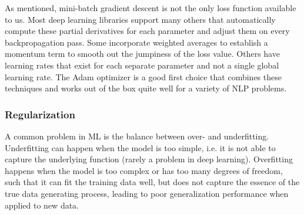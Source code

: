 As mentioned, mini-batch gradient descent is not the only loss function available to us. Most deep learning libraries support many others that
automatically compute these partial derivatives for each parameter and adjust them on every backpropagation pass. Some incorporate weighted averages to establish
a momentum term to smooth out the jumpiness of the loss value. Others have learning rates that exist for each separate parameter and not a single global learning rate.
The Adam optimizer is a good first choice that combines these techniques and works out of the box quite well for a variety of NLP problems.


\subsubsection*{Regularization}
A common problem in ML is the balance between over- and underfitting.
Underfitting can happen when the model is too simple, i.e. it is not able to capture the underlying function (rarely a problem in deep learning).
Overfitting happens when the model is too complex or has too many degrees of freedom, such that it can fit the training data well, but does not capture the essence of the true data generating process, leading to poor generalization performance when applied to new data.

